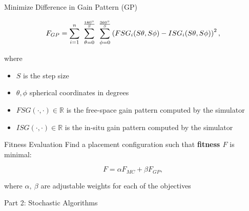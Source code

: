 \documentclass{beamer}
\begin{document}
\begin{frame}{Minimize Difference in Gain Pattern (GP)}
    \begin{tcolorbox}[colback=green!5]
        \begin{equation} \label{eq:rp}
            F_{GP} = \sum_{i=1}^n~\sum_{\theta=0}^{\frac{180\degree}{S}}~\sum_{\phi=0}^{\frac{360\degree}{S}}
            \left( FSG_i(S\theta,S\phi) - ISG_i(S\theta,S\phi) \right) ^2,
        \end{equation}
    \end{tcolorbox}
    where
    \begin{itemize}
            \small
        \item $S$ is the step size
        \item $\theta, \phi$ spherical coordinates in degrees
        \item $FSG(\cdot,\cdot) \in \mathbb R$ is the free-space gain pattern computed by the simulator
        \item $ISG(\cdot,\cdot) \in \mathbb R$ is the in-situ gain pattern computed by the simulator
    \end{itemize}
\end{frame}

\begin{frame}{Fitness Evaluation}
    Find a placement configuration such that \textbf{fitness $F$} is minimal:
    \vspace*{.5cm}
    \begin{tcolorbox}[colback=green!5]
        \begin{equation} \label{eq:optimal}
            F = \alpha F_{MC} + \beta F_{GP},
        \end{equation}
    \end{tcolorbox}
    where $\alpha,~ \beta$ are adjustable weights for each of the objectives 
\end{frame}

\begin{frame}{\null}
    \begin{tcolorbox}[colback=green!5]
        \centering\Huge
        Part 2: Stochastic Algorithms
    \end{tcolorbox}
\end{frame}
\end{document}

